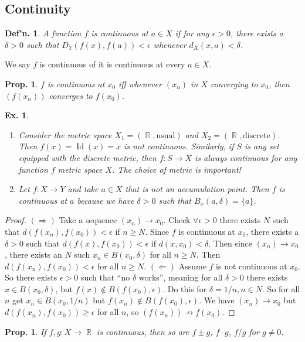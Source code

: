 \documentclass[12pt, a4paper]{book}
\DeclareMathOperator{\R}{\mathbb{R}}
\DeclareMathOperator{\Id}{Id}
\newtheorem{definition}[theorem]{Def'n.}
\newtheorem{proposition}[theorem]{Prop.}
\newtheorem{example}[theorem]{Ex.}
\theoremstyle{nonumberplain}
\newtheorem{proof}{Proof}
\begin{document}
\subsection{Continuity}
\begin{definition}
    A function $f$ is continuous at $a\in X$ if for any $\epsilon>0$, there exists a $\delta>0$ such that $D_Y(f(x),f(a))<\epsilon$
    whenever $d_X(x,a)<\delta$.
\end{definition}
We say $f$ is continuous of it is continuous at every $a\in X$.
\begin{proposition}
    $f$ is continuous at $x_0$ iff whenever $(x_n)$ in $X$ converging to $x_0$, then $(f(x_n))$ converges to $f(x_0)$.
\end{proposition}
\begin{example}
    \begin{enumerate}
        \item Consider the metric space $X_1=(\R,\text{usual})$ and $X_2=(\R,\text{discrete})$. Then $f(x)=\Id(x)=x$
            is not continuous. Similarly, if $S$ is any set equipped with the discrete metric, then $f:S\to X$ is
            always continuous for any function $f$ metric space $X$. The choice of metric is important!
        \item Let $f:X\to Y$ and take $a\in X$ that is not an accumulation point. Then $f$ is continuous at $a$ because
            we have $\delta>0$ such that $B_x(a,\delta)=\{a\}$.
    \end{enumerate}
\end{example}
\begin{proof}
    $(\Rightarrow)$ Take a sequence $(x_n)\to x_0$. Check $\forall\epsilon>0$ there exists $N$ such that $d(f(x_n),f(x_0))<\epsilon$
    if $n\geq N$. Since $f$ is continuous at $x_0$, there exists a $\delta>0$ such that $d(f(x),f(x_0))<\epsilon$ if $d(x,x_0)<\delta$.
    Then since $(x_n)\to x_0$, there exists an $N$ such $x_n\in B(x_0,\delta)$ for all $n\geq N$. Then $d(f(x_n),f(x_0))<\epsilon$
    for all $n\geq N$.
    $(\Leftarrow)$ Assume $f$ is not continuous at $x_0$. So there exists $\epsilon>0$ such that ``no $\delta$ works'',
    meaning for all $\delta>0$ there exists $x\in B(x_0,\delta)$, but $f(x)\notin B(f(x_0),\epsilon)$. Do this for
    $\delta=1/n,n\in N$. So for all $n$ get $x_n\in B(x_0,1/n)$ but $f(x_n)\notin B(f(x_0),\epsilon)$. We have $(x_n)\to x_0$
    but $d(f(x_n),f(x_0))\geq\epsilon$ for all $n$, so $(f(x_n))\not\to f(x_0)$.
\end{proof}
\begin{proposition}
    If $f,g:X\to\R$ is continuous, then so are $f\pm g$, $f\cdot g$, $f/g$ for $g\neq 0$.
\end{proposition}
\end{document}
